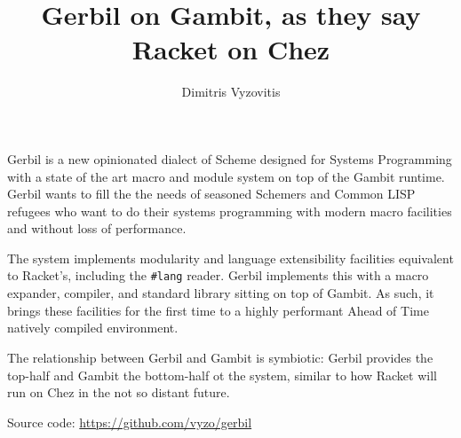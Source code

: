 \documentclass[acmlarge]{acmart}
\title[Talk]{Gerbil on Gambit, as they say Racket on Chez}
\author{Dimitris Vyzovitis}
\begin{document}
\maketitle
\thispagestyle{fancy}

Gerbil is a new opinionated dialect of Scheme designed for Systems
Programming with a state of the art macro and module system on top of
the Gambit runtime. Gerbil wants to fill the the needs of seasoned
Schemers and Common LISP refugees who want to do their systems
programming with modern macro facilities and without loss of
performance.

The system implements modularity and language extensibility facilities
equivalent to Racket's, including the {\tt \#lang} reader.  Gerbil implements
this with a macro expander, compiler, and standard library sitting on
top of Gambit.  As such, it brings these facilities for the first time
to a highly performant Ahead of Time natively compiled environment.

The relationship between Gerbil and Gambit is symbiotic: Gerbil
provides the top-half and Gambit the bottom-half ot the system,
similar to how Racket will run on Chez in the not so distant future.

\vspace{1cm}
Source code: \url{https://github.com/vyzo/gerbil}
\end{document}
